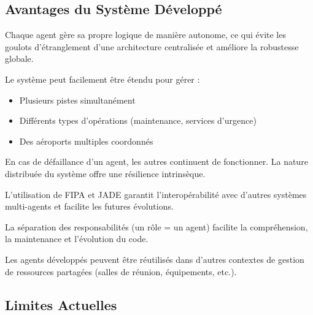 \documentclass[12pt,a4paper]{article}
\begin{document}
\subsection{Avantages du Système Développé}

\begin{description}[style=nextline, leftmargin=0pt]
    \item[\color{primaryblue}Décentralisation intelligente]
    Chaque agent gère sa propre logique de manière autonome, ce qui évite les goulots d'étranglement d'une architecture centralisée et améliore la robustesse globale.

    \item[\color{primaryblue}Scalabilité naturelle]
    Le système peut facilement être étendu pour gérer :
    \begin{itemize}
        \item Plusieurs pistes simultanément
        \item Différents types d'opérations (maintenance, services d'urgence)
        \item Des aéroports multiples coordonnés
    \end{itemize}

    \item[\color{primaryblue}Robustesse et tolérance aux pannes]
    En cas de défaillance d'un agent, les autres continuent de fonctionner. La nature distribuée du système offre une résilience intrinsèque.

    \item[\color{primaryblue}Conformité aux standards]
    L'utilisation de FIPA et JADE garantit l'interopérabilité avec d'autres systèmes multi-agents et facilite les futures évolutions.

    \item[\color{primaryblue}Maintenabilité]
    La séparation des responsabilités (un rôle = un agent) facilite la compréhension, la maintenance et l'évolution du code.

    \item[\color{primaryblue}Réutilisabilité]
    Les agents développés peuvent être réutilisés dans d'autres contextes de gestion de ressources partagées (salles de réunion, équipements, etc.).
\end{description}

\subsection{Limites Actuelles}
\end{document}
